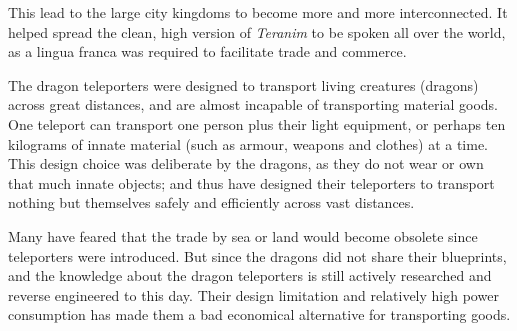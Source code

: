 This lead to the large city kingdoms to become more and more interconnected.
It helped spread the clean, high version of \emph{Teranim} to be spoken all
over the world, as a lingua franca was required to facilitate trade and
commerce.

The dragon teleporters were designed to transport living creatures (dragons)
across great distances, and are almost incapable of transporting material
goods. One teleport can transport one person plus their light equipment, or
perhaps ten kilograms of innate material (such as armour, weapons and
clothes) at a time. This design choice was deliberate by the dragons, as they
do not wear or own that much innate objects; and thus have designed their
teleporters to transport nothing but themselves safely and efficiently across
vast distances.

Many have feared that the trade by sea or land would become obsolete since
teleporters were introduced. But since the dragons did not share their
blueprints, and the knowledge about the dragon teleporters is still actively
researched and reverse engineered to this day. Their design limitation and
relatively high power consumption has made them a bad economical alternative
for transporting goods.
